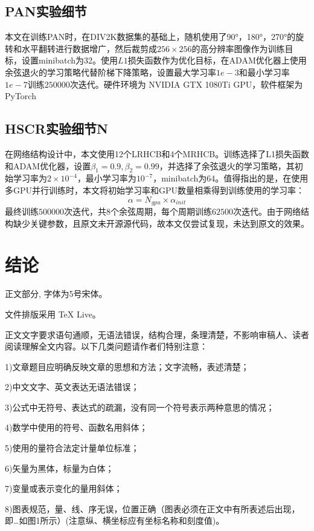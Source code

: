 \documentclass{cjc}
\begin{document}
\subsection{PAN实验细节}
本文在训练PAN时，在DIV2K数据集的基础上，随机使用了90°，180°，270°的旋转和水平翻转进行数据增广，然后裁剪成$256\times256$的高分辨率图像作为训练目标，设置minibatch为32。使用$L1$损失函数\cite{loss}作为优化目标，在ADAM优化器上使用余弦退火的学习策略代替阶梯下降策略，设置最大学习率$1e-3$和最小学习率$1e-7$训练$250000$次迭代。硬件环境为 NVIDIA GTX 1080Ti GPU，软件框架为PyTorch

\subsection{HSCR实验细节N}
在网络结构设计中，本文使用12个LRHCB和4个MRHCB。训练选择了L1损失函数和ADAM优化器，设置$\beta_1=0.9,\beta_2=0.99$，并选择了余弦退火的学习策略，其初始学习率为$2\times10^{-4}$，最小学习率为$10^{-7}$，minibatch为64。值得指出的是，在使用多GPU并行训练时，本文将初始学习率和GPU数量相乘得到训练使用的学习率：
$$\alpha = N_{gpu} \times \alpha_{init}$$
最终训练$500000$次迭代，共$8$个余弦周期，每个周期训练$62500$次迭代。由于网络结构缺少关键参数，且原文\cite{hcsrn}未开源源代码，故本文仅尝试复现，未达到原文的效果。

\section{结论}



正文部分, 字体为5号宋体。

文件排版采用 TeX Live。

正文文字要求语句通顺，无语法错误，结构合理，条理清楚，不影响审稿人、读者阅读理解全文内容。以下几类问题请作者们特别注意：

1)文章题目应明确反映文章的思想和方法；文字流畅，表述清楚；

2)中文文字、英文表达无语法错误；

3)公式中无符号、表达式的疏漏，没有同一个符号表示两种意思的情况；

4)数学中使用的符号、函数名用斜体；

5)使用的量符合法定计量单位标准；

6)矢量为黑体，标量为白体；

7)变量或表示变化的量用斜体；

8)图表规范，量、线、序无误，位置正确（图表必须在正文中有所表述后出现，即…如图1所示）(注意纵、横坐标应有坐标名称和刻度值)。
\end{document}
